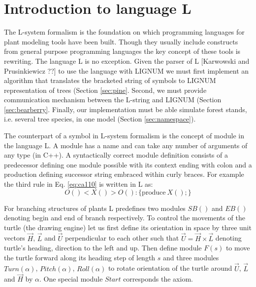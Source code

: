 \section{Introduction to language L}

The  L-system  formalism  is   the  foundation  on  which  programming
languages  for  plant modeling  tools  have  been  built. Though  they
usually include constructs  from general purpose programming languages
the key  concept of  these tools  is rewriting. The  language L  is no
exception. Given the  parser of L [Karwowski and  Prusinkiewicz ??] to
use the language with LIGNUM we must first implement an algorithm that
translates the bracketed string of symbols to LIGNUM representation of
trees (Section \ref{sec:pine}.   Second, we must provide communication
mechanism    between     the    L-string    and     LIGNUM    (Section
\ref{sec:bearberry}. Finally, our implementation must be able simulate
forest  stands,  i.e. several  tree  species,  in  one model  (Section
\ref{sec:namespace}).

The counterpart  of a symbol in  L-system formalism is  the concept of
module in the language L. A module  has a name and can take any number
of arguments  of any  type (in C++).   A syntactically  correct module
definition consists of a predecessor defining one module possible with
its  context ending  with colon  and a  production  defining successor
string embraced  within curly braces.   For example the third  rule in
Eq. \ref{eq:ca110} is written in L as:
\begin{equation}
 O() < X() > O(): \{\mathrm{produce}\ X();\}
\end{equation}

For branching structures of plants L predefines two modules $SB()$ and
$EB()$ denoting begin and end  of branch respectively.  To control the
movements of the  turtle (the drawing engine) let  us first define its
orientation  in space by  three unit  vectors $\vec  H$, $\vec  L$ and
$\vec U$ perpendicular to each other such that $\vec U = \vec H \times
\vec L$ denoting turtle's heading,  direction to the left and up. Then
define module $F(s)$ to move the turtle forward along its heading step
of  length  $s$  and  three modules  $Turn(\alpha)$,  $Pitch(\alpha)$,
$Roll(\alpha)$ to  rotate orientation of  the turtle around  $\vec U$,
$\vec  L$  and $\vec  H$  by  $\alpha$.   One special  module  $Start$
corresponds the axiom.


